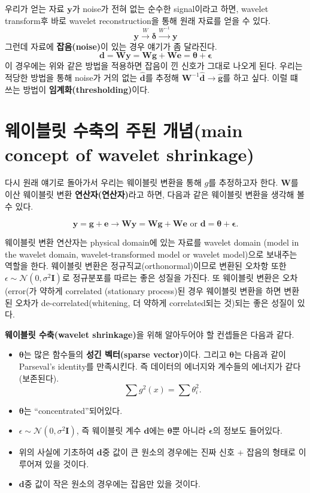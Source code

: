 \documentclass[b5paper,]{scrbook}
\theoremstyle{plain}
\theoremstyle{definition}
\numberwithin{equation}{section}
\begin{document}
우리가 얻는 자료 \(\mathbf{y}\)가 noise가 전혀 없는 순수한 signal이라고 하면, wavelet transform후 바로 wavelet reconstruction을 통해 원래 자료를 얻을 수 있다.
\[\mathbf{y} \xrightarrow{W} \boldsymbol{\delta} \xrightarrow{W^{-1}} \mathbf{y}\]
그런데 자료에 \textbf{잡음(noise)}이 있는 경우 얘기가 좀 달라진다.
\[\mathbf{d}=\mathbf{Wy} =\mathbf{Wg}+\mathbf{We}=\boldsymbol{\theta}+\boldsymbol{\epsilon}\]
이 경우에는 위와 같은 방법을 적용하면 잡음이 낀 신호가 그대로 나오게 된다. 우리는 적당한 방법을 통해 noise가 거의 없는 \(\hat{\mathbf{d}}\)를 추정해 \(\mathbf{W}^{-1}\hat{\mathbf{d}} \rightarrow \hat{\mathbf{g}}\)를 하고 싶다. 이럴 떄 쓰는 방법이 \textbf{임계화(thresholding)}이다.

\hypertarget{---main-concept-of-wavelet-shrinkage}{%
\section{웨이블릿 수축의 주된 개념(main concept of wavelet shrinkage)}\label{---main-concept-of-wavelet-shrinkage}}

다시 원래 얘기로 돌아가서 우리는 웨이블릿 변환을 통해 \(g\)를 추정하고자 한다. \(\mathbf{W}\)를 이산 웨이블릿 변환 \textbf{연산자(연산자)}라고 하면, 다음과 같은 웨이블릿 변환을 생각해 볼 수 있다.

\[\mathbf{y}=\mathbf{g}+\mathbf{e} \rightarrow \mathbf{Wy} =\mathbf{Wg}+\mathbf{We} \text{ or } \mathbf{d}=\boldsymbol{\theta}+\boldsymbol{\epsilon}.\]

웨이블릿 변환 연산자는 physical domain에 있는 자료를 wavelet domain (model in the wavelet domain, wavelet-transformed model or wavelet model)으로 보내주는 역할을 한다. 웨이블릿 변환은 정규직교(orthonormal)이므로 변환된 오차항 또한 \(\epsilon \sim \mathcal{N}(0,\sigma^{2}\mathbf{I})\)로 정규분포를 따르는 좋은 성질을 가진다. 또 웨이블릿 변환은 오차(error(가 약하게 correlated (stationary process)된 경우 웨이블릿 변환을 하면 변환된 오차가 de-correlated(whitening, 더 약하게 correlated되는 것)되는 좋은 성질이 있다.

\textbf{웨이블릿 수축(wavelet shrinkage)}을 위해 알아두어야 할 컨셉들은 다음과 같다.

\begin{itemize}
\item
  \(\boldsymbol{\theta}\)는 많은 함수들의 \textbf{성긴 벡터(sparse vector)}이다. 그리고 \(\boldsymbol{\theta}\)는 다음과 같이 Parseval's identity를 만족시킨다. 즉 데이터의 에너지와 계수들의 에너지가 같다(보존된다).
  \[\sum g^{2}(x)=\sum \theta_{i}^{2}.\]
\item
  \(\boldsymbol{\theta}\)는 ``concentrated''되어있다.
\item
  \(\epsilon \sim \mathcal{N}(0,\sigma^{2}\mathbf{I})\), 즉 웨이블릿 계수 \(\mathbf{d}\)에는 \(\boldsymbol{\theta}\)뿐 아니라 \(\mathbf{\epsilon}\)의 정보도 들어있다.
\item
  위의 사실에 기초하여 \(\mathbf{d}\)중 값이 큰 원소의 경우에는 진짜 신호 + 잡음의 형태로 이루어져 있을 것이다.
\item
  \(\mathbf{d}\)중 값이 작은 원소의 경우에는 잡음만 있을 것이다.
\end{itemize}
\end{document}
